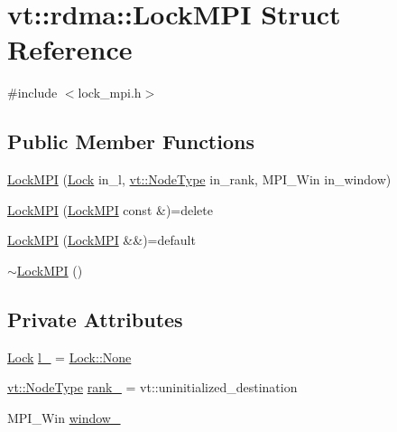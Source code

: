 \hypertarget{structvt_1_1rdma_1_1_lock_m_p_i}{}\section{vt\+:\+:rdma\+:\+:Lock\+M\+PI Struct Reference}
\label{structvt_1_1rdma_1_1_lock_m_p_i}


{\ttfamily \#include $<$lock\+\_\+mpi.\+h$>$}

\subsection*{Public Member Functions}
\begin{DoxyCompactItemize}
\item 
\hyperlink{structvt_1_1rdma_1_1_lock_m_p_i_ae2b5446ca32b39ea0d726869f113ca20}{Lock\+M\+PI} (\hyperlink{namespacevt_1_1rdma_ac5c20b41a653e520b6305d4d454ecb70}{Lock} in\+\_\+l, \hyperlink{namespacevt_a866da9d0efc19c0a1ce79e9e492f47e2}{vt\+::\+Node\+Type} in\+\_\+rank, M\+P\+I\+\_\+\+Win in\+\_\+window)
\item 
\hyperlink{structvt_1_1rdma_1_1_lock_m_p_i_a82e24ca254c74bc236c1d46811b84310}{Lock\+M\+PI} (\hyperlink{structvt_1_1rdma_1_1_lock_m_p_i}{Lock\+M\+PI} const \&)=delete
\item 
\hyperlink{structvt_1_1rdma_1_1_lock_m_p_i_a676c1958d9d6ac777801548ae805c570}{Lock\+M\+PI} (\hyperlink{structvt_1_1rdma_1_1_lock_m_p_i}{Lock\+M\+PI} \&\&)=default
\item 
\hyperlink{structvt_1_1rdma_1_1_lock_m_p_i_aa504ea8f843941e7d409fa7979afd50d}{$\sim$\+Lock\+M\+PI} ()
\end{DoxyCompactItemize}
\subsection*{Private Attributes}
\begin{DoxyCompactItemize}
\item 
\hyperlink{namespacevt_1_1rdma_ac5c20b41a653e520b6305d4d454ecb70}{Lock} \hyperlink{structvt_1_1rdma_1_1_lock_m_p_i_a5f2df5bc35976f1e84e806b0346a3680}{l\+\_\+} = \hyperlink{namespacevt_1_1rdma_ac5c20b41a653e520b6305d4d454ecb70a6adf97f83acf6453d4a6a4b1070f3754}{Lock\+::\+None}
\item 
\hyperlink{namespacevt_a866da9d0efc19c0a1ce79e9e492f47e2}{vt\+::\+Node\+Type} \hyperlink{structvt_1_1rdma_1_1_lock_m_p_i_a3f0c17bedbb2630d78cff51ba4c096ae}{rank\+\_\+} = vt\+::uninitialized\+\_\+destination
\item 
M\+P\+I\+\_\+\+Win \hyperlink{structvt_1_1rdma_1_1_lock_m_p_i_a641c0b10028472abe859317c94a1c511}{window\+\_\+}
\end{DoxyCompactItemize}



